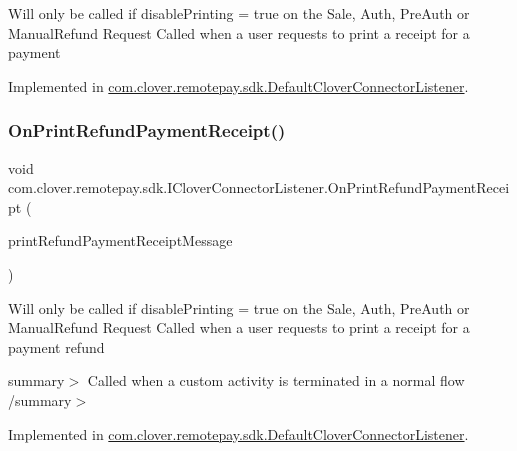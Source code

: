 Will only be called if disable\+Printing = true on the Sale, Auth, Pre\+Auth or Manual\+Refund Request Called when a user requests to print a receipt for a payment 



Implemented in \hyperlink{classcom_1_1clover_1_1remotepay_1_1sdk_1_1_default_clover_connector_listener_aeb819ef1568aac6bfdb54de3e8823685}{com.\+clover.\+remotepay.\+sdk.\+Default\+Clover\+Connector\+Listener}.

\mbox{\label{interfacecom_1_1clover_1_1remotepay_1_1sdk_1_1_i_clover_connector_listener_a728073276539065bc64d4eea1009394d}} 
\subsubsection{\texorpdfstring{On\+Print\+Refund\+Payment\+Receipt()}{OnPrintRefundPaymentReceipt()}}
{\footnotesize\ttfamily void com.\+clover.\+remotepay.\+sdk.\+I\+Clover\+Connector\+Listener.\+On\+Print\+Refund\+Payment\+Receipt (\begin{DoxyParamCaption}\item[{\hyperlink{classcom_1_1clover_1_1remotepay_1_1sdk_1_1_print_refund_payment_receipt_message}{Print\+Refund\+Payment\+Receipt\+Message}}]{print\+Refund\+Payment\+Receipt\+Message }\end{DoxyParamCaption})}



Will only be called if disable\+Printing = true on the Sale, Auth, Pre\+Auth or Manual\+Refund Request Called when a user requests to print a receipt for a payment refund 

summary$>$ Called when a custom activity is terminated in a normal flow /summary$>$ 

Implemented in \hyperlink{classcom_1_1clover_1_1remotepay_1_1sdk_1_1_default_clover_connector_listener_a13de716522e58beb9af010207e7362f2}{com.\+clover.\+remotepay.\+sdk.\+Default\+Clover\+Connector\+Listener}.

